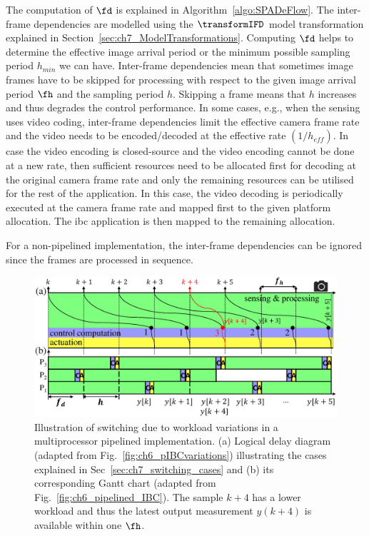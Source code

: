 The computation of $\fd$ is explained in Algorithm~\ref{algo:SPADeFlow}. The inter-frame dependencies are modelled using the $\transformIFD$ model transformation explained in Section~\ref{sec:ch7_ModelTransformations}. Computing $\fd$ helps to determine the effective image arrival period or the minimum possible sampling period $h_{min}$ we can have.
Inter-frame dependencies mean that sometimes image frames have to be skipped for processing with respect to the given image arrival period $\fh$ and the sampling period $h$.
Skipping a frame means that $h$ increases and thus degrades the control performance.
In some cases, e.g., when the sensing uses video coding, inter-frame dependencies limit the effective camera frame rate and the video needs to be encoded/decoded at the effective rate $(1/h_{\mathit{eff}})$.
In case the video encoding is closed-source and the video encoding cannot be done at a new rate, then sufficient resources need to be allocated first for decoding at the original camera frame rate and only the remaining resources can be utilised for the rest of the application.
In this case, the video decoding is periodically executed at the camera frame rate and mapped first to the given platform allocation. The \gls{ibc} application is then mapped to the remaining allocation.

For a non-pipelined implementation, the inter-frame dependencies can be ignored since the frames are processed in sequence.

\begin{figure}[t]
\centerline{
    \includegraphics[width=\textwidth]{images/switching.eps}
    }
    \caption{Illustration of switching due to workload variations in a multiprocessor pipelined implementation. (a) Logical delay diagram  (adapted from Fig.~\ref{fig:ch6_pIBCvariations}) illustrating the cases explained in Sec~\ref{sec:ch7_switching_cases} and (b) its corresponding Gantt chart (adapted from Fig.~\ref{fig:ch6_pipelined_IBC}). The sample $k+4$ has a lower workload and thus the latest output measurement $y(k+4)$ is available within one $\fh$.}
    \label{fig:ch7_switching}
\end{figure}
